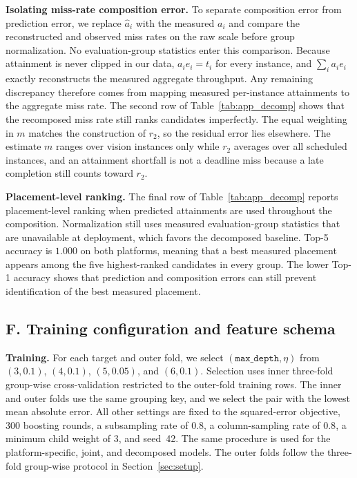 \documentclass{article}
\begin{document}
\textbf{Isolating miss-rate composition error.} To separate composition error from prediction error, we replace $\hat a_i$ with the measured $a_i$ and compare the reconstructed and observed miss rates on the raw scale before group normalization. No evaluation-group statistics enter this comparison. Because attainment is never clipped in our data, $a_i e_i=t_i$ for every instance, and $\sum_i a_i e_i$ exactly reconstructs the measured aggregate throughput. Any remaining discrepancy therefore comes from mapping measured per-instance attainments to the aggregate miss rate. The second row of Table~\ref{tab:app_decomp} shows that the recomposed miss rate still ranks candidates imperfectly. The equal weighting in $m$ matches the construction of $r_2$, so the residual error lies elsewhere. The estimate $m$ ranges over vision instances only while $r_2$ averages over all scheduled instances, and an attainment shortfall is not a deadline miss because a late completion still counts toward $r_2$.

\textbf{Placement-level ranking.} The final row of Table~\ref{tab:app_decomp} reports placement-level ranking when predicted attainments are used throughout the composition. Normalization still uses measured evaluation-group statistics that are unavailable at deployment, which favors the decomposed baseline. Top-5 accuracy is $1.000$ on both platforms, meaning that a best measured placement appears among the five highest-ranked candidates in every group. The lower Top-1 accuracy shows that prediction and composition errors can still prevent identification of the best measured placement.


\subsection*{F. Training configuration and feature schema}
\textbf{Training.} For each target and outer fold, we select $(\texttt{max\_depth},\eta)$ from $(3,0.1)$, $(4,0.1)$, $(5,0.05)$, and $(6,0.1)$. Selection uses inner three-fold group-wise cross-validation restricted to the outer-fold training rows. The inner and outer folds use the same grouping key, and we select the pair with the lowest mean absolute error. All other settings are fixed to the squared-error objective, 300 boosting rounds, a subsampling rate of $0.8$, a column-sampling rate of $0.8$, a minimum child weight of $3$, and seed~42. The same procedure is used for the platform-specific, joint, and decomposed models. The outer folds follow the three-fold group-wise protocol in Section~\ref{sec:setup}.
\end{document}
